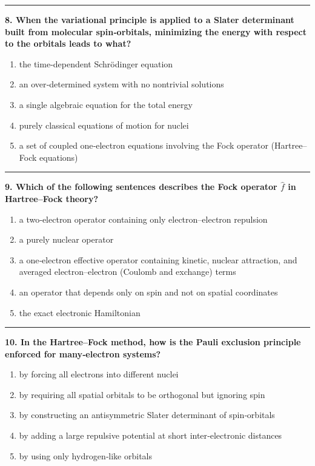 \documentclass[
  english,
  9pt,
]{extbook}
\providecommand{\tightlist}{%
  \setlength{\itemsep}{0pt}\setlength{\parskip}{0pt}}
\theoremstyle{definition}
\theoremstyle{definition}
\theoremstyle{definition}
\theoremstyle{definition}
\theoremstyle{remark}
\begin{document}
\begin{center}\rule{0.5\linewidth}{0.5pt}\end{center}

\textbf{8. When the variational principle is applied to a Slater determinant built from molecular spin‑orbitals, minimizing the energy with respect to the orbitals leads to what?}

\begin{enumerate}
\def\labelenumi{\alph{enumi}.}
\tightlist
\item
  the time‑dependent Schrödinger equation
\item
  an over‑determined system with no nontrivial solutions
\item
  a single algebraic equation for the total energy
\item
  purely classical equations of motion for nuclei
\item
  a set of coupled one‑electron equations involving the Fock operator (Hartree--Fock equations)
\end{enumerate}

\begin{center}\rule{0.5\linewidth}{0.5pt}\end{center}

\textbf{9. Which of the following sentences describes the Fock operator \(\hat{f}\) in Hartree--Fock theory?}

\begin{enumerate}
\def\labelenumi{\alph{enumi}.}
\tightlist
\item
  a two‑electron operator containing only electron--electron repulsion
\item
  a purely nuclear operator
\item
  a one‑electron effective operator containing kinetic, nuclear attraction, and averaged electron--electron (Coulomb and exchange) terms
\item
  an operator that depends only on spin and not on spatial coordinates
\item
  the exact electronic Hamiltonian
\end{enumerate}

\begin{center}\rule{0.5\linewidth}{0.5pt}\end{center}

\textbf{10. In the Hartree--Fock method, how is the Pauli exclusion principle enforced for many‑electron systems?}

\begin{enumerate}
\def\labelenumi{\alph{enumi}.}
\tightlist
\item
  by forcing all electrons into different nuclei
\item
  by requiring all spatial orbitals to be orthogonal but ignoring spin
\item
  by constructing an antisymmetric Slater determinant of spin‑orbitals
\item
  by adding a large repulsive potential at short inter‑electronic distances
\item
  by using only hydrogen‑like orbitals
\end{enumerate}
\end{document}
